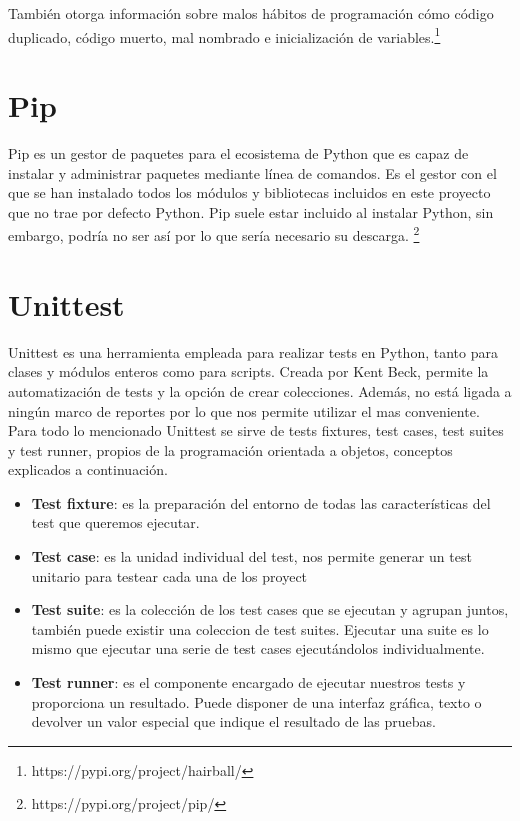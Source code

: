 \documentclass[a4paper, 12pt]{book}
\begin{document}
También otorga información sobre malos hábitos de programación cómo código duplicado, código muerto, mal nombrado e inicialización de variables.\footnote{https://pypi.org/project/hairball/}

\section{Pip} 
\label{sec:pip}

Pip es un gestor de paquetes para el ecosistema de Python que es capaz de instalar y administrar paquetes mediante línea de comandos. Es el gestor con el que se han instalado todos los módulos y bibliotecas incluidos en este proyecto que no trae por defecto Python. Pip suele estar incluido al instalar Python, sin embargo, podría no ser así por lo que sería necesario su descarga. \footnote{https://pypi.org/project/pip/}

\section{Unittest} 
\label{sec:unittest}

Unittest es una herramienta empleada para realizar tests en Python, tanto para clases y módulos enteros como para scripts. Creada por Kent Beck, permite la automatización de tests y la opción de crear colecciones. Además, no está ligada a ningún marco de reportes por lo que nos permite utilizar el mas conveniente. Para todo lo mencionado Unittest se sirve de tests fixtures, test cases, test suites y test runner, propios de la programación orientada a objetos, conceptos explicados a continuación. 

\begin{itemize}
	\item \textbf{Test fixture}: es la preparación del entorno de todas las características del test que queremos ejecutar.
	\item \textbf{Test case}: es la unidad individual del test, nos permite generar un test unitario para testear cada una de los proyect
	\item \textbf{Test suite}: es la colección de los test cases que se ejecutan y agrupan juntos, también puede existir una coleccion de test suites. Ejecutar una suite es lo mismo que ejecutar una serie de test cases ejecutándolos individualmente.
	\item \textbf{Test runner}: es el componente encargado de ejecutar nuestros tests y proporciona un resultado. Puede disponer de una interfaz gráfica, texto o devolver un valor especial que indique el resultado de las pruebas.
\end{itemize}
\end{document}

